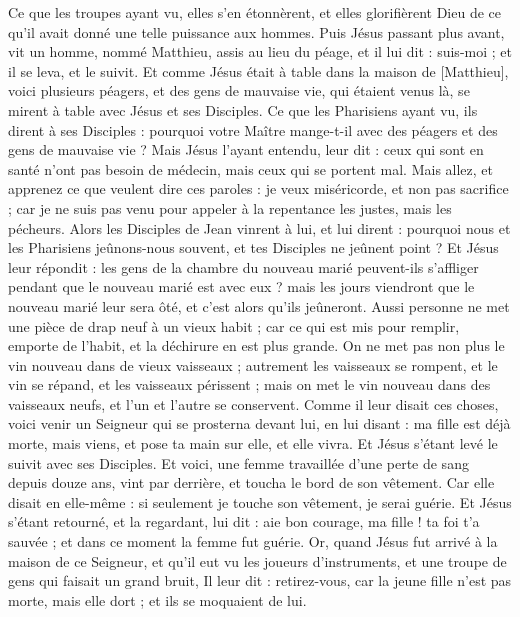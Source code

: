 \begin{multicols}{2}
Ce que les troupes ayant vu, elles s'en étonnèrent, et elles glorifièrent Dieu de ce qu'il avait donné une telle puissance aux hommes.
Puis Jésus passant plus avant, vit un homme, nommé Matthieu, assis au lieu du péage, et il lui dit : suis-moi ; et il se leva, et le suivit.
Et comme Jésus était à table dans la maison de [Matthieu], voici plusieurs péagers, et des gens de mauvaise vie, qui étaient venus là, se mirent à table avec Jésus et ses Disciples.
Ce que les Pharisiens ayant vu, ils dirent à ses Disciples : pourquoi votre Maître mange-t-il avec des péagers et des gens de mauvaise vie ?
Mais Jésus l'ayant entendu, leur dit : ceux qui sont en santé n'ont pas besoin de médecin, mais ceux qui se portent mal.
Mais allez, et apprenez ce que veulent dire ces paroles : je veux miséricorde, et non pas sacrifice ; car je ne suis pas venu pour appeler à la repentance les justes, mais les pécheurs.
Alors les Disciples de Jean vinrent à lui, et lui dirent : pourquoi nous et les Pharisiens jeûnons-nous souvent, et tes Disciples ne jeûnent point ?
Et Jésus leur répondit : les gens de la chambre du nouveau marié peuvent-ils s'affliger pendant que le nouveau marié est avec eux ? mais les jours viendront que le nouveau marié leur sera ôté, et c'est alors qu'ils jeûneront.
Aussi personne ne met une pièce de drap neuf à un vieux habit ; car ce qui est mis pour remplir, emporte de l'habit, et la déchirure en est plus grande.
On ne met pas non plus le vin nouveau dans de vieux vaisseaux ; autrement les vaisseaux se rompent, et le vin se répand, et les vaisseaux périssent ; mais on met le vin nouveau dans des vaisseaux neufs, et l'un et l'autre se conservent.
Comme il leur disait ces choses, voici venir un Seigneur qui se prosterna devant lui, en lui disant : ma fille est déjà morte, mais viens, et pose ta main sur elle, et elle vivra.
Et Jésus s'étant levé le suivit avec ses Disciples.
Et voici, une femme travaillée d'une perte de sang depuis douze ans, vint par derrière, et toucha le bord de son vêtement.
Car elle disait en elle-même : si seulement je touche son vêtement, je serai guérie.
Et Jésus s'étant retourné, et la regardant, lui dit : aie bon courage, ma fille ! ta foi t'a sauvée ; et dans ce moment la femme fut guérie.
Or, quand Jésus fut arrivé à la maison de ce Seigneur, et qu'il eut vu les joueurs d'instruments, et une troupe de gens qui faisait un grand bruit,
Il leur dit : retirez-vous, car la jeune fille n'est pas morte, mais elle dort ; et ils se moquaient de lui.

\end{multicols}
